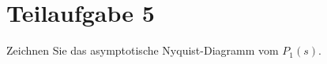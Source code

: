\section{Teilaufgabe 5}
\begin{aufgabe}
Zeichnen Sie das asymptotische Nyquist-Diagramm vom $P_1(s)$.
\end{aufgabe}
